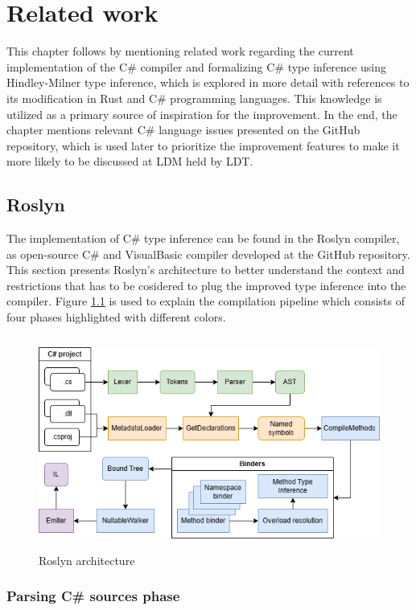 \chapter{Related work}

This chapter follows by mentioning related work regarding the current implementation of the C\# compiler and formalizing C\# type inference using Hindley-Milner type inference, which is explored in more detail with references to its modification in Rust and C\# programming languages.
This knowledge is utilized as a primary source of inspiration for the improvement.
In the end, the chapter mentions relevant C\# language issues presented on the GitHub repository, which is used later to prioritize the improvement features to make it more likely to be discussed at \ac{LDM} held by \ac{LDT}. 

\section{Roslyn}

The implementation of C\# type inference can be found in the Roslyn compiler, as open-source C\# and VisualBasic compiler developed at the GitHub repository. 
This section presents Roslyn’s architecture to better understand the context and restrictions that has to be cosidered to plug the improved type inference into the compiler.
Figure \ref{img15:roslynPip} is used to explain the compilation pipeline \cite{online:roslynArchitecture} which consists of four phases highlighted with different colors.
\begin{figure}[h]
\centering
\includegraphics[width=120mm, height=70mm]{./img/Roslyn_Arch.png}
\caption{Roslyn architecture}
\label{img15:roslynPip}
\end{figure}

\subsection{Parsing C\# sources phase}

